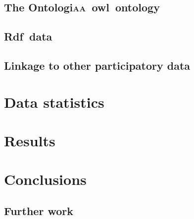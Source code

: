 \documentclass[a4paper, 11pt]{article} %
\newcommand{\aab}{\textsc{aa}}
\newcommand{\ontologiaa}{Ontologi\textsc{aa}}
\newcommand{\owl}{{\sc owl}}
\newcommand{\rdfi}{{\sc Rdf}}
\begin{document}
\subsection{The \ontologiaa\ \owl\ ontology}

\subsection{\rdfi\ data}

\subsection{Linkage to other participatory data}


\section{Data statistics}

\section{Results}

\section{Conclusions}
\subsection{Further work}

\end{document}
